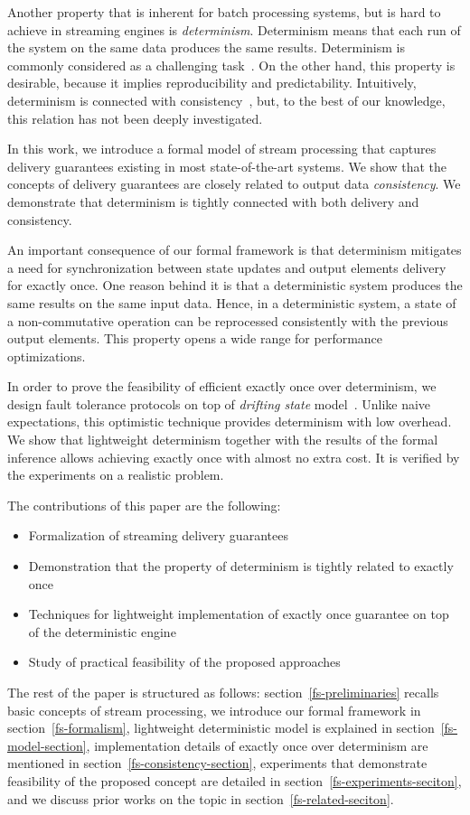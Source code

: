 
Another property that is inherent for batch processing systems, but is hard to achieve in streaming engines is {\em determinism}. Determinism means that each run of the system on the same data produces the same results. Determinism is commonly considered as a challenging task~\cite{Zacheilas:2017:MDS:3093742.3093921}. On the other hand, this property is desirable, because it implies reproducibility and predictability. Intuitively, determinism is connected with consistency~\cite{Stonebraker:2005:RRS:1107499.1107504}, but, to the best of our knowledge, this relation has not been deeply investigated. 

In this work, we introduce a formal model of stream processing that captures delivery guarantees existing in most state-of-the-art systems. We show that the concepts of delivery guarantees are closely related to output data {\em consistency}. We demonstrate that determinism is tightly connected with both delivery and consistency. 

An important consequence of our formal framework is that determinism mitigates a need for synchronization between state updates and output elements delivery for exactly once. One reason behind it is that a deterministic system produces the same results on the same input data. Hence, in a deterministic system, a state of a non-commutative operation can be reprocessed consistently with the previous output elements. This property opens a wide range for performance optimizations.

In order to prove the feasibility of efficient exactly once over determinism, we design fault tolerance protocols on top of {\em drifting state} model~\cite{we2018adbis}. Unlike naive expectations, this optimistic technique provides determinism with low overhead. We show that lightweight determinism together with the results of the formal inference allows achieving exactly once with almost no extra cost. It is verified by the experiments on a realistic problem.

The contributions of this paper are the following: 
\begin{itemize}
    \item Formalization of streaming delivery guarantees 
    \item Demonstration that the property of determinism is tightly related to exactly once
    \item Techniques for lightweight implementation of exactly once guarantee on top of the deterministic engine
    \item Study of practical feasibility of the proposed approaches
\end{itemize}

The rest of the paper is structured as follows: section~\ref{fs-preliminaries} recalls basic concepts of stream processing, we introduce our formal framework in section~\ref{fs-formalism}, lightweight deterministic model is explained in section~\ref{fs-model-section}, implementation details of exactly once over determinism are mentioned in section~\ref{fs-consistency-section}, experiments that demonstrate feasibility of the proposed concept are detailed in section~\ref{fs-experiments-seciton}, and we discuss prior works on the topic in section~\ref{fs-related-seciton}. 